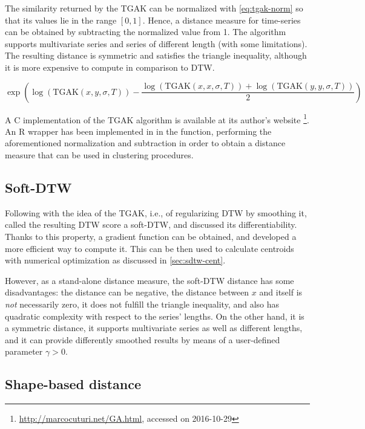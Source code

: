 The similarity returned by the TGAK can be normalized with \cref{eq:tgak-norm} so that its values lie in the range $[0,1]$.
Hence, a distance measure for time-series can be obtained by subtracting the normalized value from 1.
The algorithm supports multivariate series and series of different length (with some limitations).
The resulting distance is symmetric and satisfies the triangle inequality,
although it is more expensive to compute in comparison to DTW.

\begin{equation}
\label{eq:tgak-norm}
\exp \left( \log\left( \text{TGAK}(x,y,\sigma,T) \right) - \frac{\log\left( \text{TGAK}(x,x,\sigma,T) \right) + \log\left( \text{TGAK}(y,y,\sigma,T) \right)}{2} \right)
\end{equation}

A C implementation of the TGAK algorithm is available at its author's website%
\footnote{\url{http://marcocuturi.net/GA.html}, accessed on 2016-10-29}.
An R wrapper has been implemented in \dtwclust{} in the  function,
performing the aforementioned normalization and subtraction in order to obtain a distance measure that can be used in clustering procedures.

\subsection{Soft-DTW}
\label{sec:sdtw}

Following with the idea of the TGAK,
i.e., of regularizing DTW by smoothing it,
\citet{cuturi2017} called the resulting DTW score a soft-DTW,
and discussed its differentiability.
Thanks to this property,
a gradient function can be obtained,
and \citet{cuturi2017} developed a more efficient way to compute it.
This can be then used to calculate centroids with numerical optimization as discussed in \cref{sec:sdtw-cent}.

However, as a stand-alone distance measure,
the soft-DTW distance has some disadvantages:
the distance can be negative,
the distance between $x$ and itself is \textit{not} necessarily zero,
it does not fulfill the triangle inequality,
and also has quadratic complexity with respect to the series' lengths.
On the other hand,
it is a symmetric distance,
it supports multivariate series as well as different lengths,
and it can provide differently smoothed results by means of a user-defined parameter $\gamma > 0$.

\subsection{Shape-based distance}
\label{sec:sbd}


